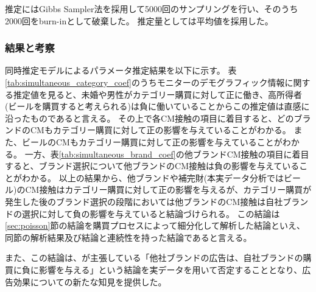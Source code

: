 \documentclass[11pt]{jsarticle}
\begin{document}
推定にはGibbs Sampler法を採用して5000回のサンプリングを行い、そのうち2000回をburn-inとして破棄した。
推定量としては平均値を採用した。

\subsubsection{結果と考察}
\label{subsec:simultaneous_result}
同時推定モデルによるパラメータ推定結果を以下に示す。
表\ref{tab:simultaneous_category_coef}のうちモニターのデモグラフィック情報に関する推定値を見ると、未婚や男性がカテゴリー購買に対して正に働き、高所得者(ビールを購買すると考えられる)は負に働いていることからこの推定値は直感に沿ったものであると言える。
その上で各CM接触の項目に着目すると、どのブランドのCMもカテゴリー購買に対して正の影響を与えていることがわかる。
また、ビールのCMもカテゴリー購買に対して正の影響を与えていることがわかる。
一方、表\ref{tab:simultaneous_brand_coef}の他ブランドCM接触の項目に着目すると、ブランド選択について他ブランドのCM接触は負の影響を与えていることがわかる。
以上の結果から、他ブランドや補完財(本実データ分析ではビール)のCM接触はカテゴリー購買に対して正の影響を与えるが、カテゴリー購買が発生した後のブランド選択の段階においては他ブランドのCM接触は自社ブランドの選択に対して負の影響を与えていると結論づけられる。
この結論は\ref{sec:poisson}節の結論を購買プロセスによって細分化して解析した結論といえ、同節の解析結果及び結論と連続性を持った結論であると言える。

また、この結論は、\citet{shimizu1990}が主張している「他社ブランドの広告は、自社ブランドの購買に負に影響を与える」という結論を実データを用いて否定することとなり、広告効果についての新たな知見を提供した。
\end{document}

